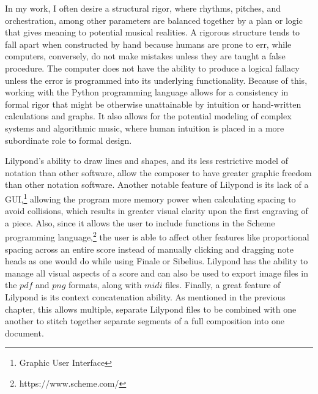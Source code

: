In my work, I often desire a structural rigor, where rhythms, pitches, and orchestration, among other parameters are balanced together by a plan or logic that gives meaning to potential musical realities. A rigorous structure tends to fall apart when constructed by hand because humans are prone to err, while computers, conversely, do not make mistakes unless they are taught a false procedure. The computer does not have the ability to produce a logical fallacy unless the error is programmed into its underlying functionality. Because of this, working with the Python programming language allows for a consistency in formal rigor that might be otherwise unattainable by intuition or hand-written calculations and graphs. It also allows for the potential modeling of complex systems and algorithmic music, where human intuition is placed in a more subordinate role to formal design.

\pagestyle{fancy}
\renewcommand\headrulewidth{0pt}
\lhead{}\chead{}\rhead{\thepage}
\cfoot{}

Lilypond’s ability to draw lines and shapes, and its less restrictive model of notation than other software, allow the composer to have greater graphic freedom than other notation software. Another notable feature of Lilypond is its lack of a GUI,\footnote{Graphic User Interface} allowing the program more memory power when calculating spacing to avoid collisions, which results in greater visual clarity upon the first engraving of a piece. Also, since it allows the user to include functions in the Scheme programming language,\footnote{https://www.scheme.com/} the user is able to affect other features like proportional spacing across an entire score instead of manually clicking and dragging note heads as one would do while using Finale or Sibelius. Lilypond has the ability to manage all visual aspects of a score and can also be used to export image files in the $pdf$ and $png$ formats, along with $midi$ files. Finally, a great feature of Lilypond is its context concatenation ability. As mentioned in the previous chapter, this allows multiple, separate Lilypond files to be combined with one another to stitch together separate segments of a full composition into one document.


